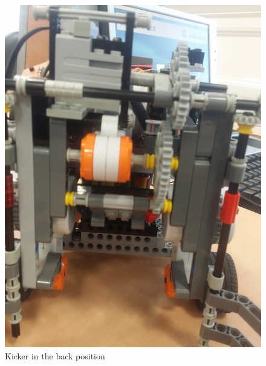 \documentclass[a4paper,12pt]{article}
\begin{document}
\begin{figure}[ht]
\begin{minipage}[b]{.3\textwidth}
	\end{minipage}
	~
	\begin{minipage}[b]{.3\textwidth}
        \centering
		\includegraphics[scale=0.04, angle=-90]{kick_back.jpg}
		\caption{Kicker in the back position}
		\label{fig:kicker_back}
	\end{minipage}
	
\end{figure}
\end{document}
